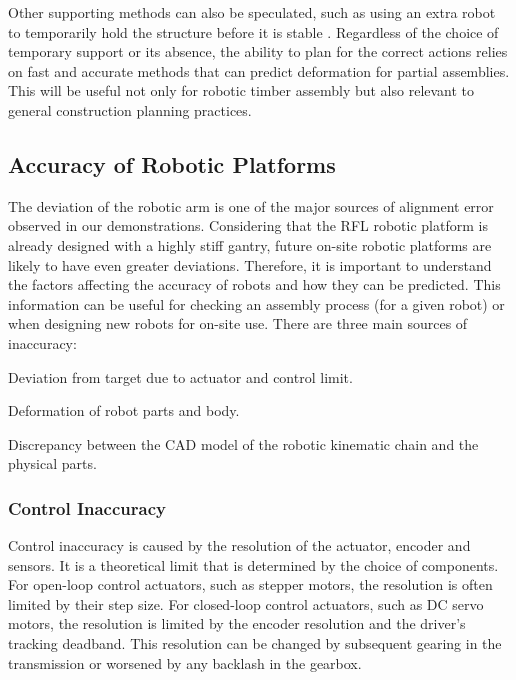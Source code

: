 Other supporting methods can also be speculated, such as using an extra robot to temporarily hold the structure before it is stable \parencite{paraschoCooperativeRoboticAssembly2019, thomaRoboticFabricationBespoke2018}. Regardless of the choice of temporary support or its absence, the ability to plan for the correct actions relies on fast and accurate methods that can predict deformation for partial assemblies. This will be useful not only for robotic timber assembly but also relevant to general construction planning practices.

\subsection{Accuracy of Robotic Platforms}
\label{subsection:new-hypo-accuracy-of-robotic-platforms}

The deviation of the robotic arm is one of the major sources of alignment error observed in our demonstrations. Considering that the RFL robotic platform is already designed with a highly stiff gantry, future on-site robotic platforms are likely to have even greater deviations. Therefore, it is important to understand the factors affecting the accuracy of robots and how they can be predicted. This information can be useful for checking an assembly process (for a given robot) or when designing new robots for on-site use. There are three main sources of inaccuracy:

\begin{description}[style=unboxed] %

	\item [Control Inaccuracy --] Deviation from target due to actuator and control limit.

	\item [Mechanical Inaccuracy --] Deformation of robot parts and body.

	\item [Forward Kinematics Inaccuracy --] Discrepancy between the CAD model of the robotic kinematic chain and the physical parts. 

\end{description}

\subsubsection{Control Inaccuracy}
\label{subsubsection:new-hypo-control-inaccuracy}

Control inaccuracy is caused by the resolution of the actuator, encoder and sensors. It is a theoretical limit that is determined by the choice of components. For open-loop control actuators, such as stepper motors, the resolution is often limited by their step size. For closed-loop control actuators, such as DC servo motors, the resolution is limited by the encoder resolution and the driver's tracking deadband. This resolution can be changed by subsequent gearing in the transmission or worsened by any backlash in the gearbox. 


